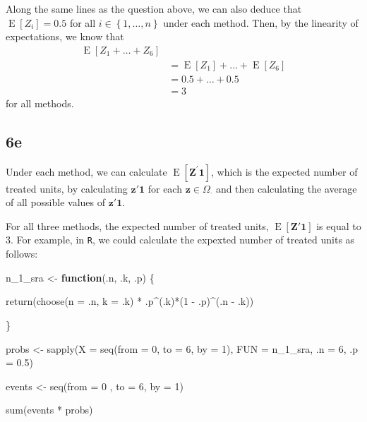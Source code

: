 \documentclass[
  12pt,
  leqno]{article}
\newenvironment{Shaded}{\begin{snugshade}}{\end{snugshade}}
\newcommand{\AttributeTok}[1]{\textcolor[rgb]{0.77,0.63,0.00}{#1}}
\newcommand{\ControlFlowTok}[1]{\textcolor[rgb]{0.13,0.29,0.53}{\textbf{#1}}}
\newcommand{\DecValTok}[1]{\textcolor[rgb]{0.00,0.00,0.81}{#1}}
\newcommand{\FloatTok}[1]{\textcolor[rgb]{0.00,0.00,0.81}{#1}}
\newcommand{\FunctionTok}[1]{\textcolor[rgb]{0.00,0.00,0.00}{#1}}
\newcommand{\NormalTok}[1]{#1}
\newcommand{\OtherTok}[1]{\textcolor[rgb]{0.56,0.35,0.01}{#1}}
\newcommand{\SpecialCharTok}[1]{\textcolor[rgb]{0.00,0.00,0.00}{#1}}
\DeclareMathOperator{\E}{\mathrm{E}}
\DeclareMathOperator{\1}{\mathbbm{1}}
\begin{document}
Along the same lines as the question above, we can also deduce that
\(\E\left[Z_i\right] = 0.5\) for all
\(i \in \left\{1, \dots , n\right\}\) under each method. Then, by the
linearity of expectations, we know that \begin{align*}
\E\left[Z_1 + \dots + Z_6\right] \\
& = \E\left[Z_1\right] + \dots + \E\left[Z_6\right] \\
& = 0.5 + \dots + 0.5 \\
& = 3
\end{align*} for all methods.

\subsection*{6e}

Under each method, we can calculate
\(\E\left[\mathbf{Z}^{\prime}\mathbf{1}\right]\), which is the expected
number of treated units, by calculating \(\mathbf{z}'\mathbf{1}\) for
each \(\mathbf{z} \in \Omega_{\cdot}\) and then calculating the average
of all possible values of \(\mathbf{z}'\mathbf{1}\).

For all three methods, the expected number of treated units,
\(\E\left[\mathbf{Z}'\mathbf{1}\right]\) is equal to \(3\). For example,
in \texttt{R}, we could calculate the expexted number of treated units
as follows:

\scriptsize

\begin{Shaded}
\begin{Highlighting}[]
\NormalTok{n\_1\_sra }\OtherTok{\textless{}{-}} \ControlFlowTok{function}\NormalTok{(.n,}
\NormalTok{                    .k,}
\NormalTok{                    .p) \{}
  
  \FunctionTok{return}\NormalTok{(}\FunctionTok{choose}\NormalTok{(}\AttributeTok{n =}\NormalTok{ .n, }\AttributeTok{k =}\NormalTok{ .k) }\SpecialCharTok{*}\NormalTok{ .p}\SpecialCharTok{\^{}}\NormalTok{(.k)}\SpecialCharTok{*}\NormalTok{(}\DecValTok{1} \SpecialCharTok{{-}}\NormalTok{ .p)}\SpecialCharTok{\^{}}\NormalTok{(.n }\SpecialCharTok{{-}}\NormalTok{ .k))}
  
\NormalTok{  \}}

\NormalTok{probs }\OtherTok{\textless{}{-}} \FunctionTok{sapply}\NormalTok{(}\AttributeTok{X =} \FunctionTok{seq}\NormalTok{(}\AttributeTok{from =} \DecValTok{0}\NormalTok{,}
                        \AttributeTok{to =} \DecValTok{6}\NormalTok{,}
                        \AttributeTok{by =} \DecValTok{1}\NormalTok{),}
                \AttributeTok{FUN =}\NormalTok{ n\_1\_sra,}
                \AttributeTok{.n =} \DecValTok{6}\NormalTok{,}
                \AttributeTok{.p =} \FloatTok{0.5}\NormalTok{)}


\NormalTok{events }\OtherTok{\textless{}{-}} \FunctionTok{seq}\NormalTok{(}\AttributeTok{from =} \DecValTok{0}\NormalTok{ , }\AttributeTok{to =} \DecValTok{6}\NormalTok{, }\AttributeTok{by =} \DecValTok{1}\NormalTok{)}

\FunctionTok{sum}\NormalTok{(events }\SpecialCharTok{*}\NormalTok{ probs)}
\end{Highlighting}
\end{Shaded}
\end{document}
